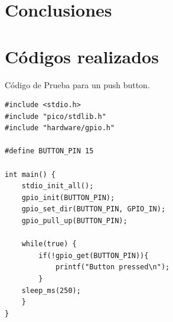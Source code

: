 \documentclass[12pt]{book} %
\begin{document}
\chapter{Conclusiones}
  \lhead[]{} 


\chapter{Códigos realizados}
  \lhead[]{} 
  
Código de Prueba para un push button.  
\begin{lstlisting}
#include <stdio.h>
#include "pico/stdlib.h"
#include "hardware/gpio.h"

#define BUTTON_PIN 15

int main() {
	stdio_init_all();
	gpio_init(BUTTON_PIN);
	gpio_set_dir(BUTTON_PIN, GPIO_IN);
	gpio_pull_up(BUTTON_PIN);

	while(true) {
		if(!gpio_get(BUTTON_PIN)){
			printf("Button pressed\n");
		}
	sleep_ms(250);
	}
}
\end{lstlisting}
\end{document}
